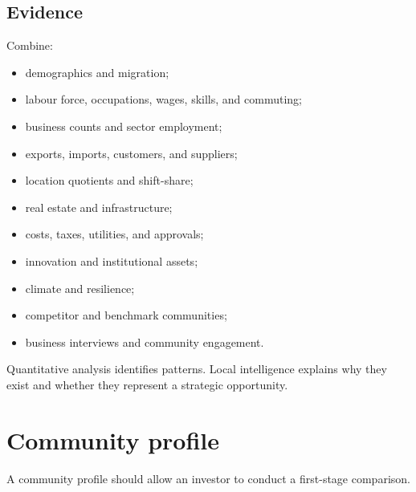 \documentclass[11pt,letterpaper,oneside,openany]{book}
\begin{document}
\subsection[Evidence]{Evidence}
Combine:


\begin{itemize}
\item demographics and migration;
\item labour force, occupations, wages, skills, and commuting;
\item business counts and sector employment;
\item exports, imports, customers, and suppliers;
\item location quotients and shift-share;
\item real estate and infrastructure;
\item costs, taxes, utilities, and approvals;
\item innovation and institutional assets;
\item climate and resilience;
\item competitor and benchmark communities;
\item business interviews and community engagement.
\end{itemize}


Quantitative analysis identifies patterns. Local intelligence explains why they exist and whether they represent a strategic opportunity.


\section[Community profile]{Community profile}
A community profile should allow an investor to conduct a first-stage comparison.


\end{document}
